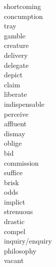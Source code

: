 \documentclass[a4paper, 10pt]{ctexart}
\begin{document}
\begin{multicols*}{2}
\begin{description}
\item[shortcoming]

\item[concumption]

\item[tray]

\item[gamble]

\item[creature]

\item[delivery]

\item[delegate]

\item[depict]

\item[claim]

\item[liberate]

\item[indispensable]

\item[perceive]

\item[affluent]

\item[dismay]

\item[oblige]

\item[bid]

\item[commission]

\item[suffice]

\item[brisk]

\item[odds]

\item[implict]

\item[strenuous]

\item[drastic]

\item[compel]

\item[inquiry/enquiry]

\item[philosophy]

\item[vacant]


\end{description}
\end{multicols*}
\end{document}

